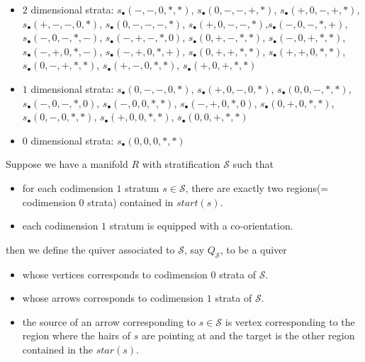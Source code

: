 \begin{definition}
\begin{enumerate}
\begin{itemize}
\item $2$ dimensional strata: $s_\bullet(-,-,0,*,*)$, $s_\bullet(0,-,-,+,*)$, $s_\bullet(+,0,-,+,*)$, $s_\bullet(+,-,-,0,*)$, $s_\bullet(0,-,-,-,*)$, $s_\bullet(+,0,-,-,*)$,$s_\bullet(-,0,-,*,+)$, $s_\bullet(-,0,-,*,-)$, $s_\bullet(-,+,-,*,0)$, $s_\bullet(0,+,-,*,*)$, $s_\bullet(-,0,+,*,*)$, $s_\bullet(-,+,0,*,-)$, $s_\bullet(-,+,0,*,+)$, $s_\bullet(0,+,+,*,*)$, $s_\bullet(+,+,0,*,*)$, $s_\bullet(0,-,+,*,*)$, $s_\bullet(+,-,0,*,*)$, $s_\bullet(+,0,+,*,*)$

\item $1$ dimensional strata: $s_\bullet(0,-,-,0,*)$, $s_\bullet(+,0,-,0,*)$, $s_\bullet(0,0,-,*,*)$, $s_\bullet(-,0,-,*,0)$, $s_\bullet(-,0,0,*,*)$, $s_\bullet(-,+,0,*,0)$, $s_\bullet(0,+,0,*,*)$, $s_\bullet(0,-,0,*,*)$, $s_\bullet(+,0,0,*,*)$, $s_\bullet(0,0,+,*,*)$

\item $0$ dimensional strata: $s_\bullet(0,0,0,*,*)$
\end{itemize}
\end{enumerate}
\end{definition}

\begin{definition}
Suppose we have a manifold $R$ with stratification $\mathcal{S}$ such that
\begin{itemize}
\item for each codimension $1$ stratum $s\in \mathcal{S}$, there are exactly two regions(= codimension $0$ strata) contained in $start(s)$.

\item each codimension $1$ stratum is equipped with a co-orientation.
\end{itemize}
then we define the quiver associated to $\mathcal{S}$, say $Q_{\mathcal{S}}$, to be a quiver
\begin{itemize}
\item whose vertices corresponds to codimension $0$ strata of $\mathcal{S}$.

\item whose arrows corresponds to codimension $1$ strata of $\mathcal{S}$.

\item the source of an arrow corresponding to $s\in \mathcal{S}$ is  vertex corresponding to the region where the hairs of $s$ are pointing at and the target is the other region contained in the $star(s)$.
\end{itemize}
\end{definition}

